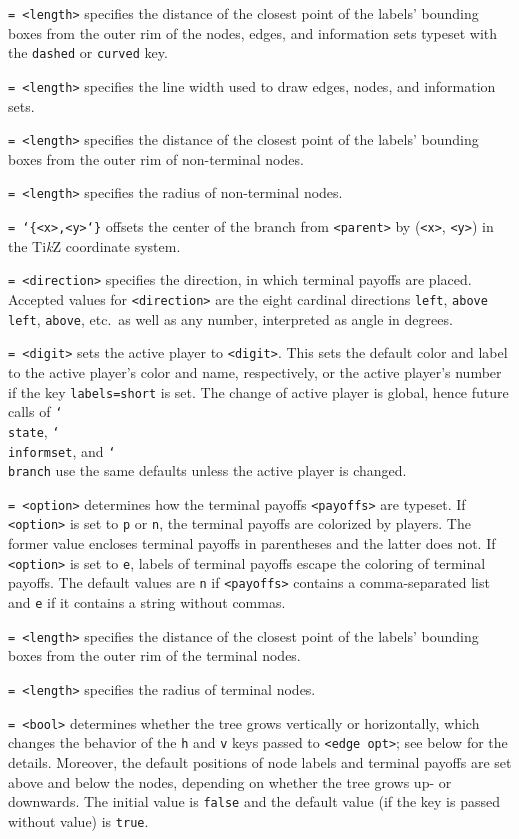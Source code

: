 \documentclass{article}
\newenvironment{desc}{\itemize[leftmargin=50pt]}{\enditemize}
\def\option#1#2{\item[\texttt{#1}] \hskip-1.5pt\texttt{#2}}
\renewcommand{\textbackslash}{\char`\\}
\def\cmd#1{\texttt{\color{cmd}\textbackslash#1}}
\def\leftbrace{\char`\{}
\def\rightbrace{\char`\}}
\def\arg#1{{\color{cmd}\leftbrace}{\color{black}#1}{\color{cmd}\rightbrace}}
\def\TikZ{Ti\emph{k}Z\xspace}
\begin{document}
\begin{desc}
\option{label sep}{= <length>} specifies the distance of the closest point of the labels' bounding boxes from the outer rim of the nodes, edges, and information sets typeset with the \texttt{dashed} or \texttt{curved} key.

\option{line width}{= <length>} specifies the line width used to draw edges, nodes, and information sets.

\option{node label sep}{= <length>} specifies the distance of the closest point of the labels' bounding boxes from the outer rim of non-terminal nodes.

\option{node radius}{= <length>} specifies the radius of non-terminal nodes.

\option{offset}{= \arg{<x>,<y>}} offsets the center of the branch from \texttt{<parent>} by (\texttt{<x>}, \texttt{<y>}) in the \TikZ coordinate system.

\option{payoffs}{= <direction>} specifies the direction, in which terminal payoffs are placed. Accepted values for \texttt{<direction>} are the eight cardinal directions \texttt{left}, \texttt{above left}, \texttt{above}, etc.\ as well as any number, interpreted as angle in degrees. 

\option{player}{= <digit>} sets the active player to \texttt{<digit>}. This sets the default color and label to the active player's color and name, respectively, or the active player's number if the key \texttt{labels=short} is set. The change of active player is global, hence future calls of \cmd{state}, \cmd{informset}, and \cmd{branch} use the same defaults unless the active player is changed.

\option{terminal}{= <option>} determines how the terminal payoffs \texttt{<payoffs>} are typeset. If \texttt{<option>} is set to \texttt{p} or \texttt{n}, the terminal payoffs are colorized by players. The former value encloses terminal payoffs in parentheses and the latter does not. If \texttt{<option>} is set to \texttt{e}, labels of terminal payoffs escape the coloring of terminal payoffs. The default values are \texttt{n} if \texttt{<payoffs>} contains a comma-separated list and \texttt{e} if it contains a string without commas.

\option{terminal label sep}{= <length>} specifies the distance of the closest point of the labels' bounding boxes from the outer rim of the terminal nodes.

\option{terminal radius}{= <length>} specifies the radius of terminal nodes. %

\option{vertical}{= <bool>} determines whether the tree grows vertically or horizontally, which changes the behavior of the \texttt{h} and \texttt{v} keys passed to \texttt{<edge opt>}; see below for the details. Moreover, the default positions of node labels and terminal payoffs are set above and below the nodes, depending on whether the tree grows up- or downwards. The initial value is \texttt{false} and the default value (if the key is passed without value) is \texttt{true}.
\end{desc}
\end{document}
